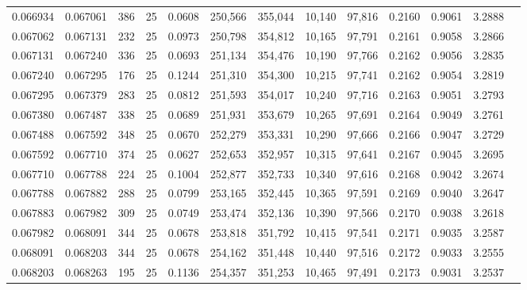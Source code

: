 \begin{tabular}{rrrrrrrrrrrrr}
0.066934 & 0.067061 &   386 &  25 &                                     0.0608 & 250,566 & 355,044 &  10,140 &  97,816 & 0.2160 & 0.9061 & 3.2888 \\
0.067062 & 0.067131 &   232 &  25 &                                     0.0973 & 250,798 & 354,812 &  10,165 &  97,791 & 0.2161 & 0.9058 & 3.2866 \\
0.067131 & 0.067240 &   336 &  25 &                                     0.0693 & 251,134 & 354,476 &  10,190 &  97,766 & 0.2162 & 0.9056 & 3.2835 \\
0.067240 & 0.067295 &   176 &  25 &                                     0.1244 & 251,310 & 354,300 &  10,215 &  97,741 & 0.2162 & 0.9054 & 3.2819 \\
0.067295 & 0.067379 &   283 &  25 &                                     0.0812 & 251,593 & 354,017 &  10,240 &  97,716 & 0.2163 & 0.9051 & 3.2793 \\
0.067380 & 0.067487 &   338 &  25 &                                     0.0689 & 251,931 & 353,679 &  10,265 &  97,691 & 0.2164 & 0.9049 & 3.2761 \\
0.067488 & 0.067592 &   348 &  25 &                                     0.0670 & 252,279 & 353,331 &  10,290 &  97,666 & 0.2166 & 0.9047 & 3.2729 \\
0.067592 & 0.067710 &   374 &  25 &                                     0.0627 & 252,653 & 352,957 &  10,315 &  97,641 & 0.2167 & 0.9045 & 3.2695 \\
0.067710 & 0.067788 &   224 &  25 &                                     0.1004 & 252,877 & 352,733 &  10,340 &  97,616 & 0.2168 & 0.9042 & 3.2674 \\
0.067788 & 0.067882 &   288 &  25 &                                     0.0799 & 253,165 & 352,445 &  10,365 &  97,591 & 0.2169 & 0.9040 & 3.2647 \\
0.067883 & 0.067982 &   309 &  25 &                                     0.0749 & 253,474 & 352,136 &  10,390 &  97,566 & 0.2170 & 0.9038 & 3.2618 \\
0.067982 & 0.068091 &   344 &  25 &                                     0.0678 & 253,818 & 351,792 &  10,415 &  97,541 & 0.2171 & 0.9035 & 3.2587 \\
0.068091 & 0.068203 &   344 &  25 &                                     0.0678 & 254,162 & 351,448 &  10,440 &  97,516 & 0.2172 & 0.9033 & 3.2555 \\
0.068203 & 0.068263 &   195 &  25 &                                     0.1136 & 254,357 & 351,253 &  10,465 &  97,491 & 0.2173 & 0.9031 & 3.2537 \\

\end{tabular}
